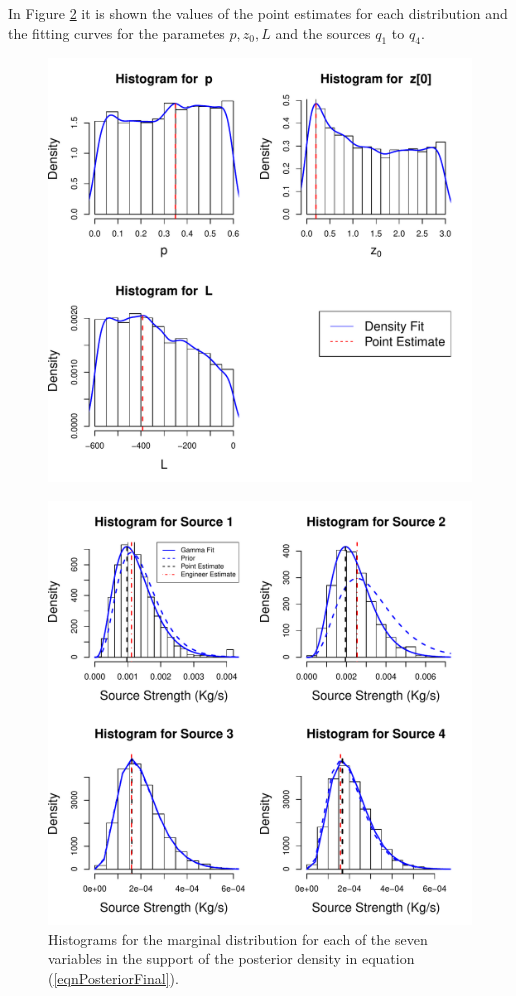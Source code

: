 \documentclass[12pt]{book}
\newcommand{\pars}{p,z_{0},L}
\begin{document}
In Figure \ref{figHistograms} it is shown the values of the point
estimates for each distribution and the fitting curves for the parametes $\pars$
and the sources $q_{1}$ to $q_{4}$.

\begin{figure}[H]
\centering
\includegraphics[scale=0.475]{./FigChap4/histogramsI}
\label{figHistograms}
\end{figure}
\begin{figure}[H]
\centering
\includegraphics[scale=0.47]{./FigChap4/histogramsII}
\caption{Histograms for the marginal distribution for each of the seven variables
in the support of the posterior density in equation (\ref{eqnPosteriorFinal}).}
\label{figHistograms}
\end{figure}
\end{document}
